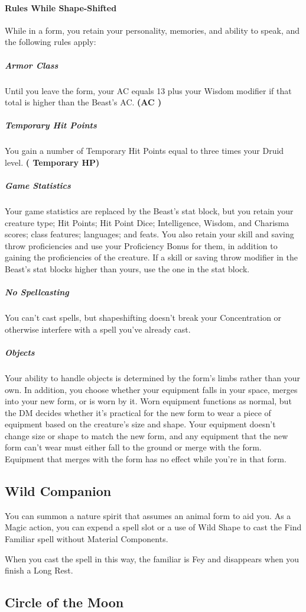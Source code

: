 \documentclass[letterpaper,openany,oneside,twocolumn]{book}
\begin{document}
\paragraph*{Rules While Shape-Shifted} While in a form, you retain your personality, memories, and ability to speak, and the following rules apply:
\subparagraph*{Armor Class} Until you leave the form, your AC equals 13 plus your Wisdom modifier if that total is higher than the Beast's AC. \textbf{(AC )}
\subparagraph*{Temporary Hit Points} You gain a number of Temporary Hit Points equal to three times your Druid level. \textbf{( Temporary HP)}
\subparagraph*{Game Statistics} Your game statistics are replaced by the Beast's stat block, but you retain your creature type; Hit Points; Hit Point Dice; Intelligence, Wisdom, and Charisma scores; class features; languages; and feats. You also retain your skill and saving throw proficiencies and use your Proficiency Bonus for them, in addition to gaining the proficiencies of the creature. If a skill or saving throw modifier in the Beast's stat blocks higher than yours, use the one in the stat block.
\subparagraph*{No Spellcasting} You can't cast spells, but shapeshifting doesn't break your Concentration or otherwise interfere with a spell you've already cast.
\subparagraph*{Objects} Your ability to handle objects is determined by the form's limbs rather than your own. In addition, you choose whether your equipment falls in your space, merges into your new form, or is worn by it. Worn equipment functions as normal, but the DM decides whether it's practical for the new form to wear a piece of equipment based on the creature's size and shape. Your equipment doesn't change size or shape to match the new form, and any equipment that the new form can't wear must either fall to the ground or merge with the form. Equipment that merges with the form has no effect while you're in that form.
\subsection*{Wild Companion}
You can summon a nature spirit that assumes an animal form to aid you. As a Magic action, you can expend a spell slot or a use of Wild Shape to cast the Find Familiar spell without Material Components.

When you cast the spell in this way, the familiar is Fey and disappears when you finish a Long Rest.
\subsection*{Circle of the Moon}
\end{document}
